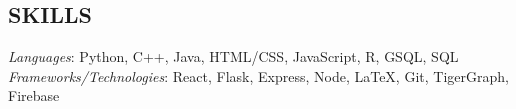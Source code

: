 \documentclass[11pt]{res}
\begin{document}
\begin{footnotesize}
\begin{resume}
\begin{small}
\section{SKILLS}
\end{small} 
\vspace{.5mm}
{\sl Languages}: 
Python, C++, Java, HTML/CSS, JavaScript, R, GSQL, SQL\\
{\sl Frameworks/Technologies}: React, Flask, Express, Node, LaTeX, Git, TigerGraph, Firebase

\end{resume}
\end{footnotesize}
\end{document}

